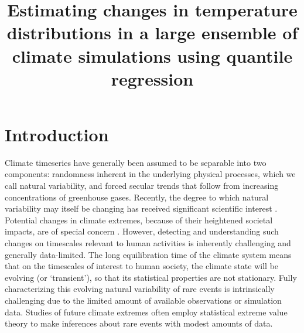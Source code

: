 \documentclass{ametsoc}
\title{Estimating changes in temperature distributions in a large ensemble of climate simulations using quantile regression}
\affiliation{University of Chicago, Chicago, USA}
\begin{document}
	
\maketitle

\section{Introduction}

Climate timeseries have generally been assumed to be separable into two components: randomness inherent in the underlying physical processes, which we call natural variability, and forced secular trends that follow from increasing concentrations of greenhouse gases.
Recently, the degree to which natural variability may itself be changing has received significant scientific interest \citep[e.g.][]{trenberth2011attribution, donat2012shifting,deser2012communication, thompson2015quantifying, kay2015community}. Potential changes in climate extremes, because of their heightened societal impacts, are of special concern \citep[e.g.][]{davison1990models, stott2004human, chavez2005generalized, eastoe2009modelling, otto2012reconciling, swain2014extraordinary, singh2014severe, trenberth2015attribution, diffenbaugh2015anthropogenic, huang2015changes, jalbert2017spatiotemporal}. 
However, detecting and understanding such changes on timescales relevant to human activities is inherently challenging and generally data-limited.
The long equilibration time of the climate system means that on the timescales of interest to human society, the climate state will be evolving (or `transient'), so that its statistical properties are not stationary. Fully characterizing this evolving natural  variability of rare events is intrinsically challenging due to the limited amount of available observations or simulation data. Studies of future climate extremes often employ statistical extreme value theory to make inferences about rare events with modest amounts of data.
\end{document}
